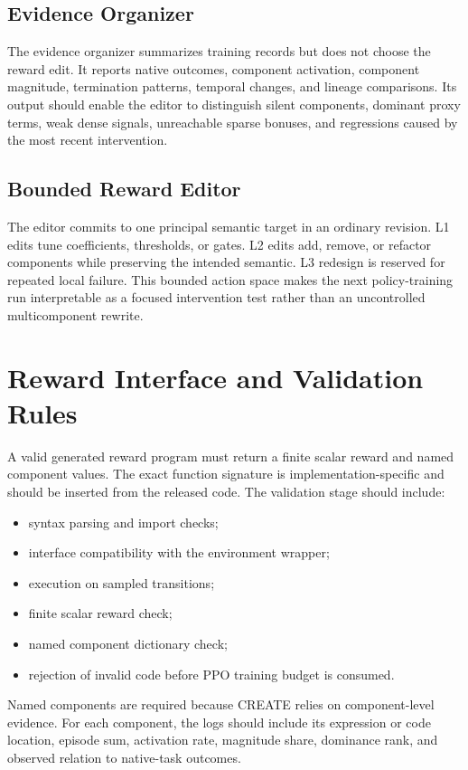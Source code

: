 \documentclass[10pt]{article}
\begin{document}
\subsection{Evidence Organizer}
The evidence organizer summarizes training records but does not choose the reward edit. It reports native outcomes, component activation, component magnitude, termination patterns, temporal changes, and lineage comparisons. Its output should enable the editor to distinguish silent components, dominant proxy terms, weak dense signals, unreachable sparse bonuses, and regressions caused by the most recent intervention.

\subsection{Bounded Reward Editor}
The editor commits to one principal semantic target in an ordinary revision. L1 edits tune coefficients, thresholds, or gates. L2 edits add, remove, or refactor components while preserving the intended semantic. L3 redesign is reserved for repeated local failure. This bounded action space makes the next policy-training run interpretable as a focused intervention test rather than an uncontrolled multicomponent rewrite.

\section{Reward Interface and Validation Rules}

A valid generated reward program must return a finite scalar reward and named component values. The exact function signature is implementation-specific and should be inserted from the released code. The validation stage should include:

\begin{itemize}
    \item syntax parsing and import checks;
    \item interface compatibility with the environment wrapper;
    \item execution on sampled transitions;
    \item finite scalar reward check;
    \item named component dictionary check;
    \item rejection of invalid code before PPO training budget is consumed.
\end{itemize}

Named components are required because CREATE relies on component-level evidence. For each component, the logs should include its expression or code location, episode sum, activation rate, magnitude share, dominance rank, and observed relation to native-task outcomes.
\end{document}
